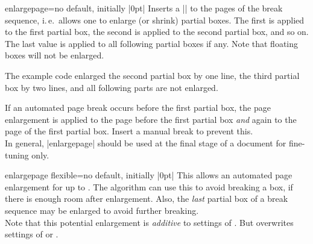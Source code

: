 \begin{docTcbKey}{enlargepage}{=}{no default, initially |0pt|}
  Inserts a |\enlargethispage| to the pages of the break sequence,
  i.\,e.\ allows one to enlarge (or shrink) partial boxes. The first  is applied
  to the first partial box, the second  is applied
  to the second partial box, and so on. The last  value is applied
  to all following partial boxes if any. Note that floating boxes will not be enlarged.
\begin{dispListing}
\begin{tcolorbox}[breakable,enlargepage=0mm/\baselineskip/2\baselineskip/0mm,...
\end{dispListing}
  The example code enlarged the second partial box by one line, the third
  partial box by two lines, and all following parts are not enlarged.
  \begin{marker}
  If an automated page break occurs before the first partial box, the
  page enlargement is applied to the page before the first partial box \emph{and}
  again to the page of the first partial box. Insert a manual break to prevent this.\\
  In general, |enlargepage| should be used at the final stage of a document
  for fine-tuning only.
  \end{marker}
\end{docTcbKey}

\clearpage
\begin{docTcbKey}{enlargepage flexible}{=}{no default, initially |0pt|}
  This allows an automated page enlargement for up to .
  The algorithm can use this to avoid breaking a box, if there is enough room
  after enlargement. Also, the \emph{last} partial box of a break sequence
  may be enlarged to avoid further breaking.\\
  Note that this potential enlargement is \emph{additive} to settings of
  .
  But  overwrites settings of
   or .
\begin{dispListing}
\end{dispListing}
\end{docTcbKey}


